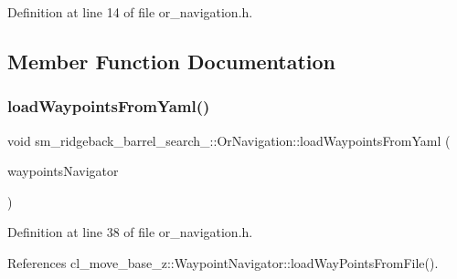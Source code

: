 Definition at line 14 of file or\+\_\+navigation.\+h.



\subsection{Member Function Documentation}
\mbox{\label{classsm__ridgeback__barrel__search__1_1_1OrNavigation_a875df5d1fdcd34f568e6db573dfbaed7}} 
\subsubsection{\texorpdfstring{load\+Waypoints\+From\+Yaml()}{loadWaypointsFromYaml()}}
{\footnotesize\ttfamily void sm\+\_\+ridgeback\+\_\+barrel\+\_\+search\+\_\+::\+Or\+Navigation\+::load\+Waypoints\+From\+Yaml (\begin{DoxyParamCaption}\item[{\hyperlink{classcl__move__base__z_1_1WaypointNavigator}{Waypoint\+Navigator} $\ast$}]{waypoints\+Navigator }\end{DoxyParamCaption})\hspace{0.3cm}{\ttfamily [inline]}}



Definition at line 38 of file or\+\_\+navigation.\+h.



References cl\+\_\+move\+\_\+base\+\_\+z\+::\+Waypoint\+Navigator\+::load\+Way\+Points\+From\+File().


